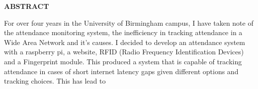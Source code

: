 \providecommand\phantomsection{} \phantomsection
\begin{center}
\providecommand\pdfbookmark[3][]{} \pdfbookmark[0]{Abstract}{bm:Abstract}
\vspace*{1in}
\textbf{ABSTRACT}\\[2\baselineskip]
\end{center}

For over four years in the University of Birmingham campus, I  have taken note of the attendance monitoring system, the inefficiency in tracking attendance  in a Wide Area Network and it's causes.
I decided to develop an attendance system with a raspberry pi, a website, RFID (Radio Frequency Identification Devices) and a Fingerprint module. This produced a system that is capable of tracking attendance in cases of short internet latency gaps given different options and tracking choices. This has lead to 

